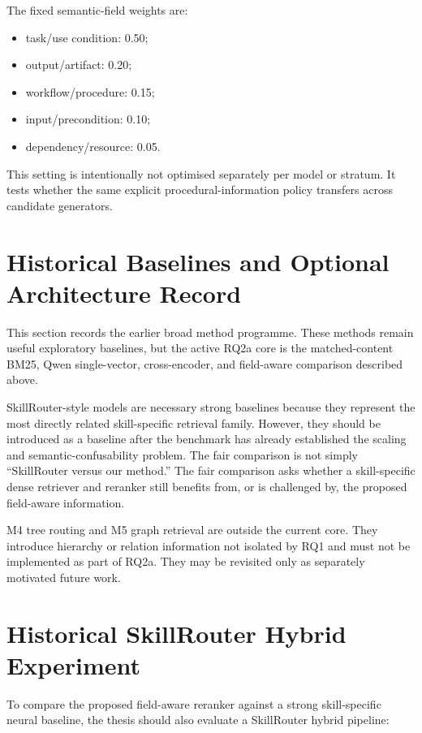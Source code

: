 The fixed semantic-field weights are:

\begin{itemize}
  \item task/use condition: 0.50;
  \item output/artifact: 0.20;
  \item workflow/procedure: 0.15;
  \item input/precondition: 0.10;
  \item dependency/resource: 0.05.
\end{itemize}

This setting is intentionally not optimised separately per model or stratum. It tests whether the same explicit procedural-information policy transfers across candidate generators.

\section{Historical Baselines and Optional Architecture Record}

This section records the earlier broad method programme. These methods remain useful exploratory baselines, but the active RQ2a core is the matched-content BM25, Qwen single-vector, cross-encoder, and field-aware comparison described above.

SkillRouter-style models are necessary strong baselines because they represent the most directly related skill-specific retrieval family. However, they should be introduced as a baseline after the benchmark has already established the scaling and semantic-confusability problem. The fair comparison is not simply ``SkillRouter versus our method.'' The fair comparison asks whether a skill-specific dense retriever and reranker still benefits from, or is challenged by, the proposed field-aware information.

M4 tree routing and M5 graph retrieval are outside the current core. They introduce hierarchy or relation information not isolated by RQ1 and must not be implemented as part of RQ2a. They may be revisited only as separately motivated future work.

\section{Historical SkillRouter Hybrid Experiment}

To compare the proposed field-aware reranker against a strong skill-specific neural baseline, the thesis should also evaluate a SkillRouter hybrid pipeline:

